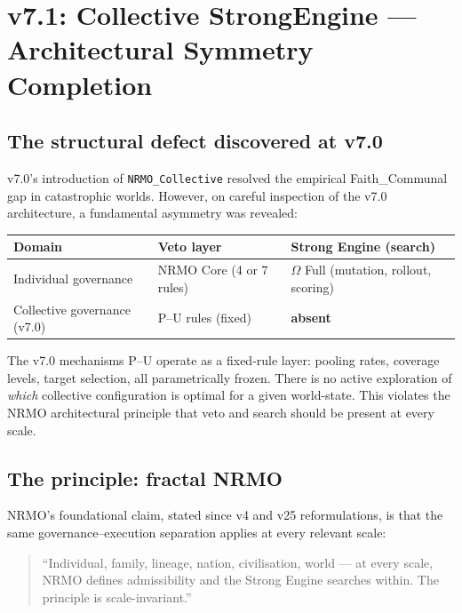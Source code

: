 \section{v7.1: Collective StrongEngine — Architectural Symmetry Completion}
\label{sec:collective-strong-engine-v71}

\subsection{The structural defect discovered at v7.0}

v7.0's introduction of \texttt{NRMO\_Collective} resolved the empirical
Faith\_Communal gap in catastrophic worlds. However, on careful
inspection of the v7.0 architecture, a fundamental asymmetry was
revealed:

\begin{center}
\begin{tabular}{lll}
\toprule
Domain & Veto layer & Strong Engine (search) \\
\midrule
Individual governance & NRMO Core (4 or 7 rules) & $\Omega$ Full (mutation, rollout, scoring) \\
Collective governance (v7.0) & P--U rules (fixed) & \textbf{absent} \\
\bottomrule
\end{tabular}
\end{center}

The v7.0 mechanisms P--U operate as a fixed-rule layer: pooling rates,
coverage levels, target selection, all parametrically frozen. There
is no active exploration of \emph{which} collective configuration is
optimal for a given world-state. This violates the NRMO architectural
principle that veto and search should be present at every scale.

\subsection{The principle: fractal NRMO}

NRMO's foundational claim, stated since v4 and v25 reformulations, is
that the same governance--execution separation applies at every
relevant scale:

\begin{quote}
``Individual, family, lineage, nation, civilisation, world — at every
scale, NRMO defines admissibility and the Strong Engine searches
within. The principle is scale-invariant.''
\end{quote}

